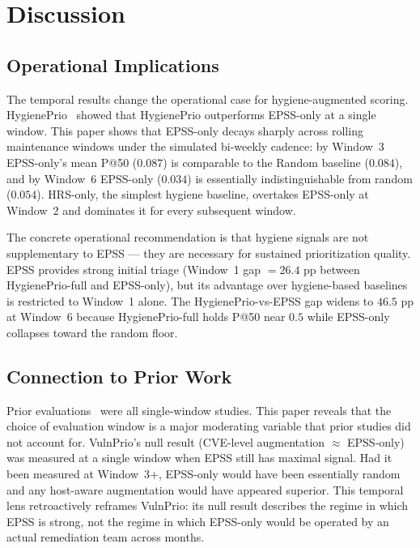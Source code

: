 \section{Discussion}

\subsection{Operational Implications}

The temporal results change the operational case for hygiene-augmented scoring. HygienePrio~\cite{paper4hygieneprio} showed that HygienePrio outperforms EPSS-only at a single window. This paper shows that EPSS-only decays sharply across rolling maintenance windows under the simulated bi-weekly cadence: by Window~3 EPSS-only's mean P@50 ($0.087$) is comparable to the Random baseline ($0.084$), and by Window~6 EPSS-only ($0.034$) is essentially indistinguishable from random ($0.054$). HRS-only, the simplest hygiene baseline, overtakes EPSS-only at Window~2 and dominates it for every subsequent window.

The concrete operational recommendation is that hygiene signals are not supplementary to EPSS --- they are necessary for sustained prioritization quality. EPSS provides strong initial triage (Window~1 gap $= 26.4$ pp between HygienePrio-full and EPSS-only), but its advantage over hygiene-based baselines is restricted to Window~1 alone. The HygienePrio-vs-EPSS gap widens to $46.5$ pp at Window~6 because HygienePrio-full holds P@50 near $0.5$ while EPSS-only collapses toward the random floor.

\subsection{Connection to Prior Work}

Prior evaluations~\cite{paper1vulnprio,paper3hygienebench,paper4hygieneprio} were all single-window studies. This paper reveals that the choice of evaluation window is a major moderating variable that prior studies did not account for. VulnPrio's null result (CVE-level augmentation $\approx$ EPSS-only) was measured at a single window when EPSS still has maximal signal. Had it been measured at Window~3+, EPSS-only would have been essentially random and any host-aware augmentation would have appeared superior. This temporal lens retroactively reframes VulnPrio: its null result describes the regime in which EPSS is strong, not the regime in which EPSS-only would be operated by an actual remediation team across months.

